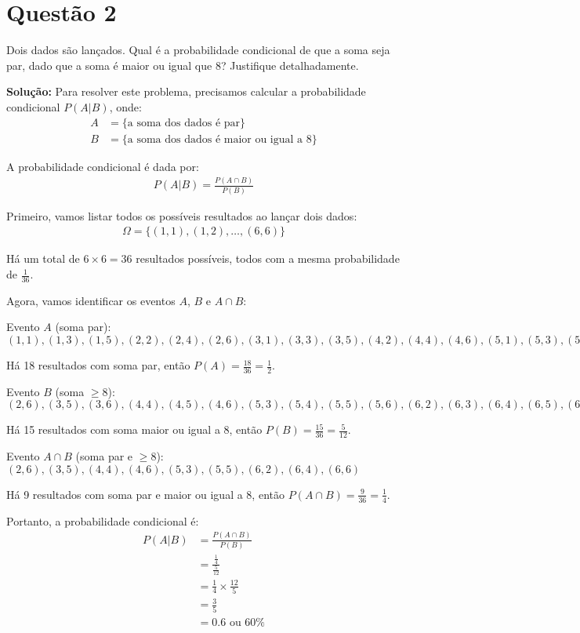 \documentclass[fleqn,a4paper]{article}
\begin{document}
\section*{Questão 2}
Dois dados são lançados. Qual é a probabilidade condicional de que a soma seja par, dado que a soma é maior ou igual que 8? Justifique detalhadamente.

\textbf{Solução:}
Para resolver este problema, precisamos calcular a probabilidade condicional $P(A|B)$, onde:
\begin{align}
A &= \{\text{a soma dos dados é par}\} \\
B &= \{\text{a soma dos dados é maior ou igual a 8}\}
\end{align}

A probabilidade condicional é dada por:
\begin{align}
P(A|B) = \frac{P(A \cap B)}{P(B)}
\end{align}

Primeiro, vamos listar todos os possíveis resultados ao lançar dois dados:
\begin{align}
\Omega = \{(1,1), (1,2), \ldots, (6,6)\}
\end{align}

Há um total de $6 \times 6 = 36$ resultados possíveis, todos com a mesma probabilidade de $\frac{1}{36}$.

Agora, vamos identificar os eventos $A$, $B$ e $A \cap B$:

Evento $A$ (soma par): $(1,1), (1,3), (1,5), (2,2), (2,4), (2,6), (3,1), (3,3), (3,5), (4,2), (4,4), (4,6), (5,1), (5,3), (5,5), (6,2), (6,4), (6,6)$

Há 18 resultados com soma par, então $P(A) = \frac{18}{36} = \frac{1}{2}$.

Evento $B$ (soma $\geq 8$): $(2,6), (3,5), (3,6), (4,4), (4,5), (4,6), (5,3), (5,4), (5,5), (5,6), (6,2), (6,3), (6,4), (6,5), (6,6)$

Há 15 resultados com soma maior ou igual a 8, então $P(B) = \frac{15}{36} = \frac{5}{12}$.

Evento $A \cap B$ (soma par e $\geq 8$): $(2,6), (3,5), (4,4), (4,6), (5,3), (5,5), (6,2), (6,4), (6,6)$

Há 9 resultados com soma par e maior ou igual a 8, então $P(A \cap B) = \frac{9}{36} = \frac{1}{4}$.

Portanto, a probabilidade condicional é:
\begin{align}
P(A|B) &= \frac{P(A \cap B)}{P(B)} \\
&= \frac{\frac{1}{4}}{\frac{5}{12}} \\
&= \frac{1}{4} \times \frac{12}{5} \\
&= \frac{3}{5} \\
&= 0.6 \text{ ou } 60\%
\end{align}
\end{document}
